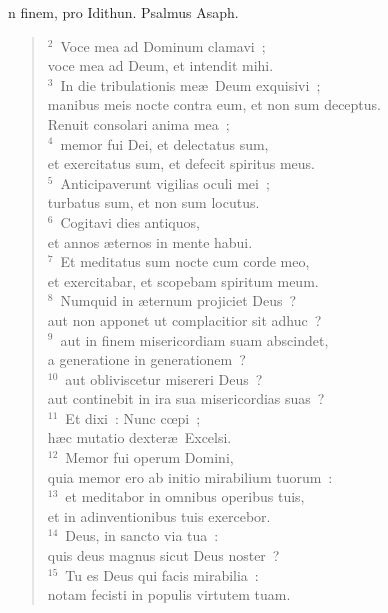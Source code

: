 \bchapter
{}n finem, pro Idithun. Psalmus Asaph.
\begin{flushleft}\begin{verse}\vspace{6pt}${}^{2}$~Voce mea ad Dominum clamavi~;\\ voce mea ad Deum, et intendit mihi.\\
${}^{3}$~In die tribulationis me\ae\ Deum exquisivi~;\\ manibus meis nocte contra eum, et non sum deceptus.\\ Renuit consolari anima mea~;\\
${}^{4}$~memor fui Dei, et delectatus sum,\\ et exercitatus sum, et defecit spiritus meus.\\
${}^{5}$~Anticipaverunt vigilias oculi mei~;\\ turbatus sum, et non sum locutus.\\
${}^{6}$~Cogitavi dies antiquos,\\ et annos \ae ternos in mente habui.\\
${}^{7}$~Et meditatus sum nocte cum corde meo,\\ et exercitabar, et scopebam spiritum meum.\\
${}^{8}$~Numquid in \ae ternum projiciet Deus~?\\ aut non apponet ut complacitior sit adhuc~?\\
${}^{9}$~aut in finem misericordiam suam abscindet,\\ a generatione in generationem~?\\
${}^{10}$~aut obliviscetur misereri Deus~?\\ aut continebit in ira sua misericordias suas~?\\
${}^{11}$~Et dixi~: Nunc cœpi~;\\ h\ae c mutatio dexter\ae\ Excelsi.\\
${}^{12}$~Memor fui operum Domini,\\ quia memor ero ab initio mirabilium tuorum~:\\
${}^{13}$~et meditabor in omnibus operibus tuis,\\ et in adinventionibus tuis exercebor.\\
${}^{14}$~Deus, in sancto via tua~:\\ quis deus magnus sicut Deus noster~?\\
${}^{15}$~Tu es Deus qui facis mirabilia~:\\ notam fecisti in populis virtutem tuam.\\

\end{verse}
\end{flushleft}
